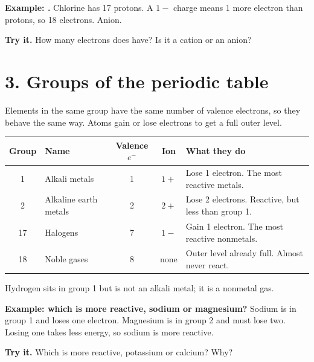 \textbf{Example: .} Chlorine has 17 protons. A $1-$ charge means 1 more electron than protons, so 18 electrons. Anion.

\textbf{Try it.} How many electrons does  have? Is it a cation or an anion?\ans

\section*{3. Groups of the periodic table}
Elements in the same group have the same number of valence electrons, so they behave the same way. Atoms gain or lose electrons to get a full outer level.

\begin{tabular}{clccp{5.2cm}}\toprule
Group & Name & Valence $e^-$ & Ion & What they do\\\midrule
1 & Alkali metals & 1 & $1+$ & Lose 1 electron. The most reactive metals.\\
2 & Alkaline earth metals & 2 & $2+$ & Lose 2 electrons. Reactive, but less than group 1.\\
17 & Halogens & 7 & $1-$ & Gain 1 electron. The most reactive nonmetals.\\
18 & Noble gases & 8 & none & Outer level already full. Almost never react.\\\bottomrule
\end{tabular}

Hydrogen sits in group 1 but is not an alkali metal; it is a nonmetal gas.

\textbf{Example: which is more reactive, sodium or magnesium?} Sodium is in group 1 and loses one electron. Magnesium is in group 2 and must lose two. Losing one takes less energy, so sodium is more reactive.

\textbf{Try it.} Which is more reactive, potassium or calcium? Why?\ans[2]

